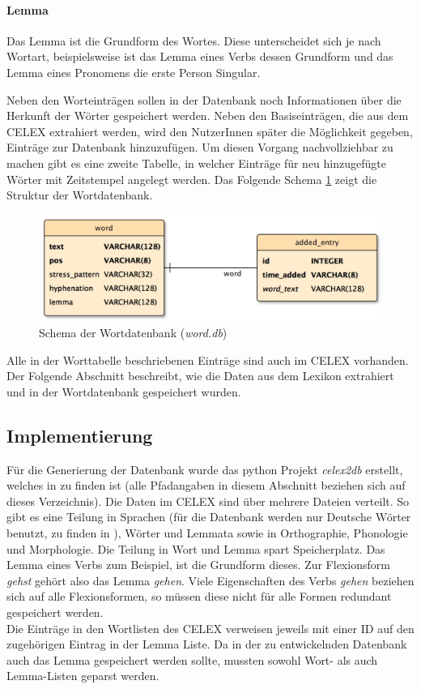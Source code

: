 \paragraph{Lemma}
Das Lemma ist die Grundform des Wortes. Diese unterscheidet sich je nach Wortart, beispielsweise ist das Lemma eines Verbs dessen Grundform und das Lemma eines Pronomens die erste Person Singular.


Neben den Worteinträgen sollen in der Datenbank noch Informationen über die Herkunft der Wörter gespeichert werden. Neben den Basiseinträgen, die aus dem CELEX extrahiert werden, wird den NutzerInnen später die Möglichkeit gegeben, Einträge zur Datenbank hinzuzufügen. Um diesen Vorgang nachvollziehbar zu machen gibt es eine zweite Tabelle, in welcher Einträge für neu hinzugefügte Wörter mit Zeitstempel angelegt werden. Das Folgende Schema \ref{fig:worddatabase} zeigt die Struktur der Wortdatenbank.

\begin{figure}[h!]
	\centering
	\includegraphics[width=.6\linewidth]{figures/worddb}
	\caption{Schema der Wortdatenbank (\textit{word.db})}
	\label{fig:worddatabase}
\end{figure}

Alle in der Worttabelle beschriebenen Einträge sind auch im CELEX vorhanden. Der Folgende Abschnitt beschreibt, wie die Daten aus dem Lexikon extrahiert und in der Wortdatenbank gespeichert wurden.

\subsection{Implementierung}

Für die Generierung der Datenbank wurde das python Projekt \textit{celex2db} erstellt, welches in  zu finden ist (alle Pfadangaben in diesem Abschnitt beziehen sich auf dieses Verzeichnis). Die Daten im CELEX sind über mehrere Dateien verteilt. So gibt es eine Teilung in Sprachen (für die Datenbank werden nur Deutsche Wörter benutzt, zu finden in ), Wörter und Lemmata sowie in Orthographie, Phonologie und Morphologie. Die Teilung in Wort und Lemma spart Speicherplatz. Das Lemma eines Verbs zum Beispiel, ist die Grundform dieses. Zur Flexionsform \textit{gehst} gehört also das Lemma \textit{gehen}. Viele Eigenschaften des Verbs \textit{gehen} beziehen sich auf alle Flexionsformen, so müssen diese nicht für alle Formen redundant gespeichert werden.\\
Die Einträge in den Wortlisten des CELEX verweisen jeweils mit einer ID auf den zugehörigen Eintrag in der Lemma Liste. Da in der zu entwickelnden Datenbank auch das Lemma gespeichert werden sollte, mussten sowohl Wort- als auch Lemma-Listen geparst werden.

